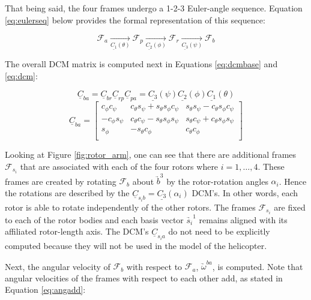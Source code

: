 \documentclass[journal]{IEEEtran}
\begin{document}
That being said, the four frames undergo a 1-2-3 Euler-angle sequence. Equation \ref{eq:eulerseq} below provides the formal representation of this sequence:

\begin{equation}
	\mathcal{F}_a \xrightarrow[\underline{C_1}(\theta)]{} \mathcal{F}_p \xrightarrow[\underline{C_2}(\phi)]{} \mathcal{F}_r \xrightarrow[\underline{C_3}(\psi)]{} \mathcal{F}_b
	\label{eq:eulerseq}
\end{equation}

The overall DCM matrix is computed next in Equations \ref{eq:dcmbase} and \ref{eq:dcm}:

\begin{equation}
	\underline{C}_{ba}=\underline{C}_{br}\underline{C}_{rp}\underline{C}_{pa}=\underline{C_3}{(\psi)}\underline{C_2}{(\phi)}\underline{C_1}{(\theta)}
	\label{eq:dcmbase}
\end{equation}
\begin{equation}
	\underline{C}_{ba}=\left[ \begin{array}{ccc}
	c_{\phi}c_{\psi} & c_{\theta}s_{\psi}+s_{\theta}s_{\phi}c_{\psi} & s_{\theta}s_{\psi}-c_{\theta}s_{\phi}c_{\psi} \\
	-c_{\phi}s_{\psi} & c_{\theta}c_{\psi}-s_{\theta}s_{\phi}s_{\psi} & s_{\theta}c_{\psi}+c_{\theta}s_{\phi}s_{\psi} \\
	s_{\phi} & -s_{\theta}c_{\phi} & c_{\theta}c_{\phi} \\
	\end{array} \right]
	\label{eq:dcm}
\end{equation}

Looking at Figure \ref{fig:rotor_arm}, one can see that there are additional frames $\mathcal{F}_{s_i}$ that are associated with each of the four rotors where $i=1,\ldots,4$. These frames are created by rotating $\mathcal{F}_b$ about $\underrightarrow{b}^3$ by the rotor-rotation angles $\alpha_i$. Hence the rotations are described by the $\underline{C}_{s_ib}=\underline{C_3}(\alpha_i)$ DCM's. In other words, each rotor is able to rotate independently of the other rotors. The frames $\mathcal{F}_{s_i}$ are fixed to each of the rotor bodies and each basis vector $\underrightarrow{s_i}^1$ remains aligned with its affiliated rotor-length axis. The DCM's $\underline{C}_{s_ia}$ do not need to be explicitly computed because they will not be used in the model of the helicopter.

Next, the angular velocity of $\mathcal{F}_b$ with respect to $\mathcal{F}_a$, $\underrightarrow{\omega}^{ba}$, is computed. Note that angular velocities of the frames with respect to each other add, as stated in Equation \ref{eq:angadd}:
\end{document}
